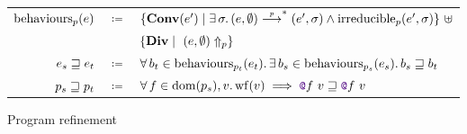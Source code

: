 \begin{figure}[tp]
    \centering
    \\
    \begin{tabular}{rcl}
        	$\mathrm{behaviours}_{\datalangProg} (\datalangExpr)$
        	& $\coloneqq$ &
			$\{ \constr[\datalangExpr']{Conv} \mid \exists \datalangState \ldotp (\datalangExpr, \emptyset) \step{\datalangProg}^* (\datalangExpr', \datalangState) \wedge \mathrm{irreducible}_{\datalangProg} (\datalangExpr', \datalangState) \}\ \uplus$
    	\\
            &&
    		$\{ \constr{Div} \mid\ \diverges{\datalangProg}{(\datalangExpr, \emptyset)} \}$
        \\
            $\datalangExpr_s \refined \datalangExpr_t$
            & $\coloneqq$ &
            $\forall b_t \in \mathrm{behaviours}_{\datalangProg_t} (\datalangExpr_t) \ldotp
            \exists b_s \in \mathrm{behaviours}_{\datalangProg_s} (\datalangExpr_s) \ldotp
            b_s \refined b_t$
        \\
            $\datalangProg_s \refined \datalangProg_t$
            & $\coloneqq$ &
            $\forall \datalangFn \in \dom{\datalangProg_s}, \datalangVal \ldotp
            \wf{\datalangVal} \implies
            \datalangCall{\datalangFnptr{\datalangFn}}{\datalangVal} \refined \datalangCall{\datalangFnptr{\datalangFn}}{\datalangVal}$
    \end{tabular}
    \caption{Program refinement}
    \label{fig:refinement}
\end{figure}